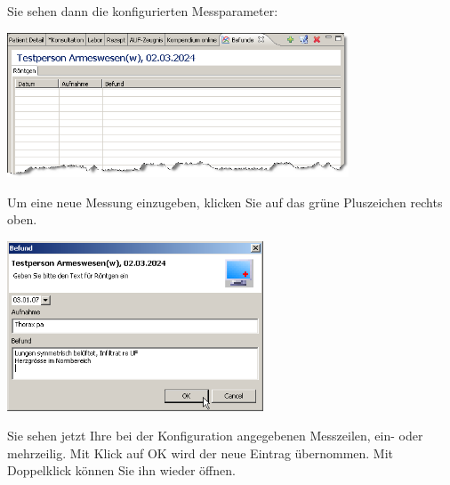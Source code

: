 Sie sehen dann die konfigurierten Messparameter:
\begin{flushleft}
\includegraphics[width=4in]{images/befunde5.png}
\end{flushleft}
Um eine neue Messung einzugeben, klicken Sie auf das grüne Pluszeichen rechts oben.
\begin{flushleft}
\includegraphics[width=3in]{images/befunde6.png}
\end{flushleft}
Sie sehen jetzt Ihre bei der Konfiguration angegebenen Messzeilen, ein- oder mehrzeilig. Mit Klick auf OK wird der neue Eintrag übernommen. Mit Doppelklick können Sie ihn wieder öffnen.
